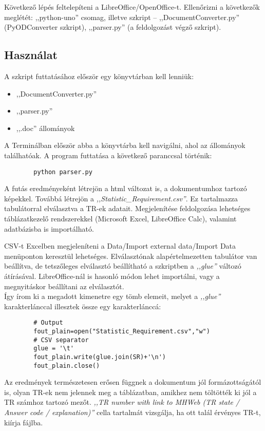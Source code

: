 \documentclass[a4paper,oneside,12pt]{article}
\begin{document}
	Következő lépés feltelepíteni a LibreOffice/OpenOffice-t. Ellenőrizni a következők meglétét: ,,python-uno'' csomag, illetve szkript -- ,,DocumentConverter.py'' (PyODConverter szkript), ,,parser.py'' (a feldolgozást végző szkript).
\subsection{Használat}
	A szkript futtatásához először egy könyvtárban kell lenniük:
	\begin{itemize}
		\item ,,DocumentConverter.py''
		\item ,,parser.py''
		\item ,,.doc'' állományok
	\end{itemize}
	A Terminálban először abba a könyvtárba kell navigálni, ahol az állományok találhatóak. A program futtatása a következő paranccsal történik:
	\begin{verbatim}
		python parser.py
	\end{verbatim}
	A futás eredményeként létrejön a html változat is, a dokumentumhoz tartozó képekkel. Továbbá létrejön a \emph{,,Statistic\_Requirement.csv''}. Ez tartalmazza tabulátorral elválasztva a TR-ek adatait. Megjelenítése feldolgozása lehetséges táblázatkezelő rendszerekkel (Microsoft Excel, LibreOffice Calc), valamint adatbázisba is importálható.
	
	CSV-t Excelben megjeleníteni a Data/Import external data/Import Data menüponton keresztül lehetséges. Elválasztónak alapértelmezetten tabulátor van beállítva, de tetszőleges elválasztó beállítható a szkriptben a \emph{,,glue''} változó átírásával. LibreOffice-nál is hasonló módon lehet importálni, vagy a megnyitáskor beállítani az elválasztót. \\
	Így írom ki a megadott kimenetre egy tömb elemeit, melyet a \emph{,,glue''} karakterlánccal illesztek össze egy karakterlánccá:
	\begin{verbatim}
		# Output
		fout_plain=open("Statistic_Requirement.csv","w")
		# CSV separator
		glue = '\t'
		fout_plain.write(glue.join(SR)+'\n')
		fout_plain.close()
	\end{verbatim}
	Az eredmények természetesen erősen függnek a dokumentum jól formázottságától is, olyan TR-ek nem jelennek meg a táblázatban, amikhez nem töltötték ki jól a TR számhoz tartozó mezőt. \emph{,,TR number with link to MHWeb (TR state / Answer code / explanation)''} cella tartalmát vizsgálja, ha ott talál érvényes TR-t, kiírja fájlba.
	
\end{document}
